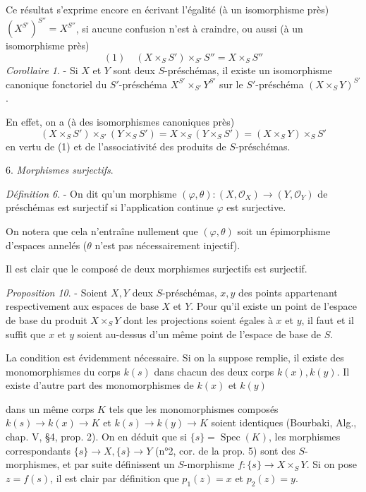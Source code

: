 Ce résultat s'exprime encore en écrivant l'égalité (à un isomorphisme près) $(X^{S'})^{S''} = X^{S''}$, si aucune confusion n'est à craindre, ou aussi (à un isomorphisme près)
$$(1) \quad (X \times_S S') \times_{S'} S'' = X \times_S S''$$
\emph{Corollaire 1}. - Si $X$ et $Y$ sont deux $S$-préschémas, il existe un isomorphisme canonique fonctoriel du $S'$-préschéma $X^{S'} \times_{S'} Y^{S'}$ sur le $S'$-préschéma $(X \times_S Y)^{S'}$.

En effet, on a (à des isomorphismes canoniques près)
$$(X \times_S S') \times_{S'} (Y \times_S S') = X \times_S (Y \times_S S') = (X \times_S Y) \times_S S'$$
en vertu de (1) et de l'associativité des produits de $S$-préschémas.

6. \emph{Morphismes surjectifs}.

\emph{Définition 6}. - On dit qu'un morphisme $(\varphi, \theta) : (X, \mathcal{O}_X) \to (Y, \mathcal{O}_Y)$ de préschémas est surjectif si l'application continue $\varphi$ est surjective.

On notera que cela n'entraîne nullement que $(\varphi, \theta)$ soit un épimorphisme d'espaces annelés ($\theta$ n'est pas nécessairement injectif).

Il est clair que le composé de deux morphismes surjectifs est surjectif.

\emph{Proposition 10}. - Soient $X, Y$ deux $S$-préschémas, $x, y$ des points appartenant respectivement aux espaces de base $X$ et $Y$. Pour qu'il existe un point de l'espace de base du produit $X \times_S Y$ dont les projections soient égales à $x$ et $y$, il faut et il suffit que $x$ et $y$ soient au-dessus d'un même point de l'espace de base de $S$.

La condition est évidemment nécessaire. Si on la suppose remplie, il existe des monomorphismes du corps $k(s)$ dans chacun des deux corps $k(x), k(y)$. Il existe d'autre part des monomorphismes de $k(x)$ et $k(y)$

\newpage


dans un même corps $K$ tels que les monomorphismes composés
$k(s) \to k(x) \to K$ et $k(s) \to k(y) \to K$ soient identiques (Bourbaki, Alg., chap. V, §4, prop. 2). On en déduit que si $\{s\} = \operatorname{Spec}(K)$, les morphismes correspondants $\{s\} \to X, \{s\} \to Y$ (n°2, cor. de la prop. 5) sont des $S$-morphismes, et par suite définissent un $S$-morphisme $f: \{s\} \to X \times_S Y$.
Si on pose $z=f(s)$, il est clair par définition que $p_1(z)=x$ et $p_2(z)=y$.

